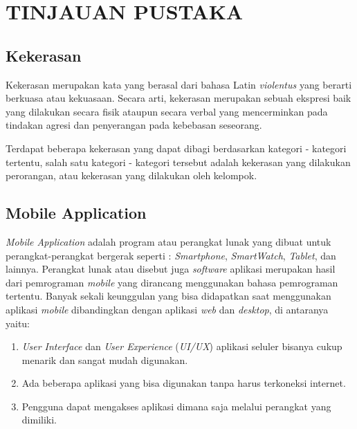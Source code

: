 \chapter{TINJAUAN PUSTAKA}

\section{Kekerasan}

Kekerasan merupakan kata yang berasal dari bahasa Latin \textit{violentus} yang berarti berkuasa atau kekuasaan. Secara arti, kekerasan merupakan sebuah ekspresi baik yang dilakukan secara fisik ataupun secara verbal yang mencerminkan pada tindakan agresi dan penyerangan pada kebebasan seseorang.

Terdapat beberapa kekerasan yang dapat dibagi berdasarkan kategori - kategori tertentu, salah satu kategori - kategori tersebut adalah kekerasan yang dilakukan perorangan, atau kekerasan yang dilakukan oleh kelompok.


\section{Mobile Application}

\textit{Mobile Application} adalah program atau perangkat lunak yang dibuat untuk perangkat-perangkat bergerak seperti : \textit{Smartphone}, \textit{SmartWatch}, \textit{Tablet}, dan lainnya. Perangkat lunak atau disebut juga \textit{software} aplikasi merupakan hasil dari pemrograman \textit{mobile} yang dirancang menggunakan bahasa pemrograman tertentu. Banyak sekali keunggulan yang bisa didapatkan saat menggunakan aplikasi \textit{mobile} dibandingkan dengan aplikasi \textit{web} dan \textit{desktop}, di antaranya yaitu:
\begin{enumerate}[nolistsep]
  \item \textit{User Interface} dan \textit{User Experience} (\textit{UI/UX}) aplikasi seluler bisanya cukup menarik dan sangat mudah digunakan.

  \item Ada beberapa aplikasi yang bisa digunakan tanpa harus terkoneksi internet.

  \item Pengguna dapat mengakses aplikasi dimana saja melalui perangkat yang dimiliki.
\end{enumerate}

